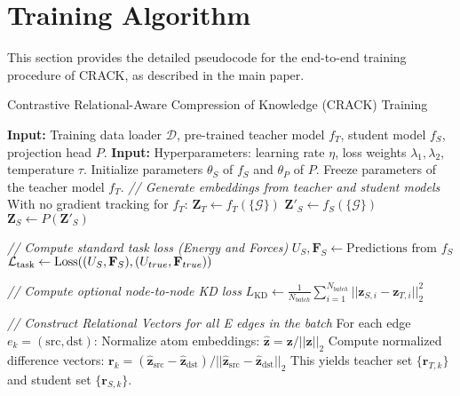 \documentclass{article}
\begin{document}
\section{Training Algorithm}
This section provides the detailed pseudocode for the end-to-end training procedure of CRACK, as described in the main paper.
\begin{algorithm}[H]
    \caption{Contrastive Relational-Aware Compression of Knowledge (CRACK) Training}
    \label{alg:crack}
    \begin{algorithmic}[1]
    \STATE \textbf{Input:} Training data loader $\mathcal{D}$, pre-trained teacher model $f_T$, student model $f_S$, projection head $P$.
    \STATE \textbf{Input:} Hyperparameters: learning rate $\eta$, loss weights $\lambda_1, \lambda_2$, temperature $\tau$.
    \STATE Initialize parameters $\theta_S$ of $f_S$ and $\theta_P$ of $P$.
    \STATE Freeze parameters of the teacher model $f_T$.
            \STATE \textit{// Generate embeddings from teacher and student models}
            \STATE With no gradient tracking for $f_T$:
            \STATE $\mathbf{Z}_T \leftarrow f_T(\{\mathcal{G}\})$  
            \STATE $\mathbf{Z}'_S \leftarrow f_S(\{\mathcal{G}\})$ 
            \STATE $\mathbf{Z}_S \leftarrow P(\mathbf{Z}'_S)$ 
            
            \STATE \textit{// Compute standard task loss (Energy and Forces)}
            \STATE $U_S, \mathbf{F}_S \leftarrow \text{Predictions from } f_S$
            \STATE $\mathcal{L}_{\text{task}} \leftarrow \text{Loss}( (U_S, \mathbf{F}_S), (U_{true}, \mathbf{F}_{true}) )$
            
            \STATE \textit{// Compute optional node-to-node KD loss}
            \STATE $L_{\text{KD}} \leftarrow \frac{1}{N_{batch}} \sum_{i=1}^{N_{batch}} ||\mathbf{z}_{S,i} - \mathbf{z}_{T,i}||^2_2$

            \STATE \textit{// Construct Relational Vectors for all E edges in the batch}
            \STATE For each edge $e_k = (\text{src}, \text{dst})$:
            \STATE Normalize atom embeddings: $\hat{\mathbf{z}} = \mathbf{z} / ||\mathbf{z}||_2$
            \STATE Compute normalized difference vectors: $\mathbf{r}_k = (\hat{\mathbf{z}}_{\text{src}} - \hat{\mathbf{z}}_{\text{dst}}) / ||\hat{\mathbf{z}}_{\text{src}} - \hat{\mathbf{z}}_{\text{dst}}||_2$
            \STATE This yields teacher set $\{\mathbf{r}_{T,k}\}$ and student set $\{\mathbf{r}_{S,k}\}$.


\end{algorithmic}
\end{algorithm}
\end{document}
